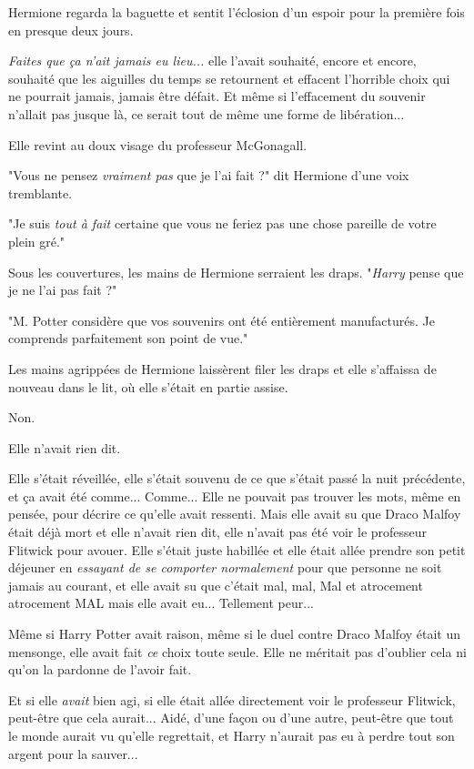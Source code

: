 Hermione regarda la baguette et sentit l'éclosion d'un espoir pour la première fois en presque deux jours.

\emph{Faites que ça n'ait jamais eu lieu...} elle l'avait souhaité, encore et encore, souhaité que les aiguilles du temps se retournent et effacent l'horrible choix qui ne pourrait jamais, jamais être défait. Et même si l'effacement du souvenir n'allait pas jusque là, ce serait tout de même une forme de libération...

Elle revint au doux visage du professeur McGonagall.

"Vous ne pensez \emph{vraiment pas}  que je l'ai fait ?" dit Hermione d'une voix tremblante.

"Je suis \emph{tout à fait}  certaine que vous ne feriez pas une chose pareille de votre plein gré."

Sous les couvertures, les mains de Hermione serraient les draps. "\emph{Harry}  pense que je ne l'ai pas fait ?"

"M. Potter considère que vos souvenirs ont été entièrement manufacturés. Je comprends parfaitement son point de vue."

Les mains agrippées de Hermione laissèrent filer les draps et elle s'affaissa de nouveau dans le lit, où elle s'était en partie assise.

Non.

Elle n'avait rien dit.

Elle s'était réveillée, elle s'était souvenu de ce que s'était passé la nuit précédente, et ça avait été comme... Comme... Elle ne pouvait pas trouver les mots, même en pensée, pour décrire ce qu'elle avait ressenti. Mais elle avait su que Draco Malfoy était déjà mort et elle n'avait rien dit, elle n'avait pas été voir le professeur Flitwick pour avouer. Elle s'était juste habillée et elle était allée prendre son petit déjeuner en \emph{essayant de se comporter normalement}  pour que personne ne soit jamais au courant, et elle avait su que c'était mal, mal, Mal et atrocement atrocement MAL mais elle avait eu... Tellement peur...

Même si Harry Potter avait raison, même si le duel contre Draco Malfoy était un mensonge, elle avait fait \emph{ce}  choix toute seule. Elle ne méritait pas d'oublier cela ni qu'on la pardonne de l'avoir fait.

Et si elle \emph{avait}  bien agi, si elle était allée directement voir le professeur Flitwick, peut-être que cela aurait... Aidé, d'une façon ou d'une autre, peut-être que tout le monde aurait vu qu'elle regrettait, et Harry n'aurait pas eu à perdre tout son argent pour la sauver...

